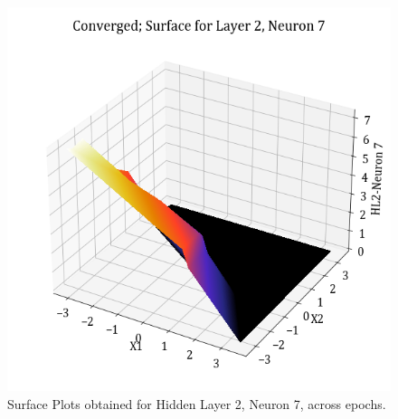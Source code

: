 \documentclass[11pt,a4paper]{article}
\begin{document}
\begin{figure}[H]
    \includegraphics[scale=0.4]{images/1B_MLFFNN_conv_HL2_N7.png}
    \caption{Surface Plots obtained for Hidden Layer 2, Neuron 7, across epochs.}
\end{figure}
\end{document}

